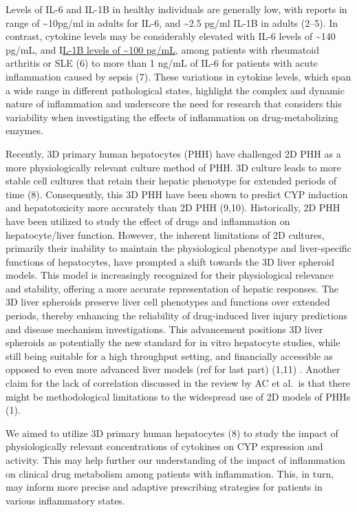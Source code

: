 \documentclass[
  letterpaper,
  DIV=11,
  numbers=noendperiod,
  oneside]{scrartcl}
\begin{document}
Levels of IL-6 and IL-1B in healthy individuals are generally low, with
reports in range of \textasciitilde10pg/ml in adults for IL-6, and
\textasciitilde2.5 pg/ml IL-1B in adults (2--5). In contrast, cytokine
levels may be considerably elevated with IL-6 levels of
\textasciitilde140 pg/mL, and I\ul{L-1B levels of \textasciitilde100
pg/mL}, among patients with rheumatoid arthritis or SLE (6) to more than
1 ng/mL of IL-6 for patients with acute inflammation caused by sepsis
(7). These variations in cytokine levels, which span a wide range in
different pathological states, highlight the complex and dynamic nature
of inflammation and underscore the need for research that considers this
variability when investigating the effects of inflammation on
drug-metabolizing enzymes.

Recently, 3D primary human hepatocytes (PHH) have challenged 2D PHH as a
more physiologically relevant culture method of PHH. 3D culture leads to
more stable cell cultures that retain their hepatic phenotype for
extended periods of time (8). Consequently, this 3D PHH have been shown
to predict CYP induction and hepatotoxicity more accurately than 2D PHH
(9,10). Historically, 2D PHH have been utilized to study the effect of
drugs and inflammation on hepatocyte/liver function. However, the
inherent limitations of 2D cultures, primarily their inability to
maintain the physiological phenotype and liver-specific functions of
hepatocytes, have prompted a shift towards the 3D liver spheroid models.
This model is increasingly recognized for their physiological relevance
and stability, offering a more accurate representation of hepatic
responses. The 3D liver spheroids preserve liver cell phenotypes and
functions over extended periods, thereby enhancing the reliability of
drug-induced liver injury predictions and disease mechanism
investigations. This advancement positions 3D liver spheroids as
potentially the new standard for in vitro hepatocyte studies, while
still being suitable for a high throughput setting, and financially
accessible as opposed to even more advanced liver models (ref for last
part) (1,11) . Another claim for the lack of correlation discussed in
the review by AC et al.~is that there might be methodological
limitations to the widespread use of 2D models of PHHs (1).

We aimed to utilize 3D primary human hepatocytes (8) to study the impact
of physiologically relevant concentrations of cytokines on CYP
expression and activity. This may help further our understanding of the
impact of inflammation on clinical drug metabolism among patients with
inflammation. This, in turn, may inform more precise and adaptive
prescribing strategies for patients in various inflammatory states.
\end{document}
